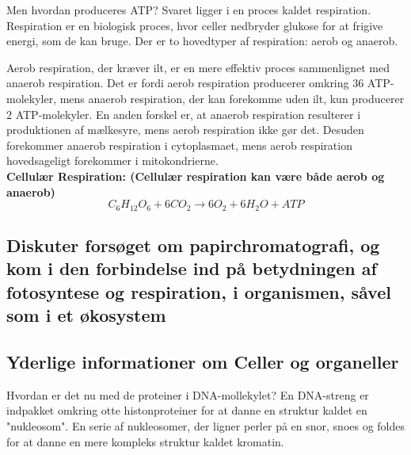         Men hvordan produceres ATP? Svaret ligger i en proces kaldet respiration. Respiration er en biologisk proces, hvor celler nedbryder glukose for at frigive energi, som de kan bruge. Der er to hovedtyper af respiration: aerob og anaerob.
        
        Aerob respiration, der kræver ilt, er en mere effektiv proces sammenlignet med anaerob respiration. Det er fordi aerob respiration producerer omkring 36 ATP-molekyler, mens anaerob respiration, der kan forekomme uden ilt, kun producerer 2 ATP-molekyler. En anden forskel er, at anaerob respiration resulterer i produktionen af mælkesyre, mens aerob respiration ikke gør det. Desuden forekommer anaerob respiration i cytoplasmaet, mens aerob respiration hovedsageligt forekommer i mitokondrierne. \\
        \textbf{Cellulær Respiration: (Cellulær respiration kan være både aerob og anaerob) }\begin{equation}C_6H_{12}O_6 + 6CO_2 \rightarrow 6O_2 + 6H_2O + ATP \end{equation}


    \subsection*{Diskuter forsøget om papirchromatografi, og kom i den forbindelse ind på betydningen af fotosyntese og respiration, i organismen, såvel som i et økosystem}
        

    \subsection*{Yderlige informationer om Celler og organeller}
    Hvordan er det nu med de proteiner i DNA-mollekylet? \label{sec:protein} En DNA-streng er indpakket omkring otte histonproteiner for at danne en struktur kaldet en "nukleosom". En serie af nukleosomer, der ligner perler på en snor, snoes og foldes for at danne en mere kompleks struktur kaldet kromatin. 
